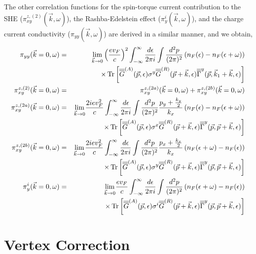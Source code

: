 \documentclass[letter,12pt,preprint,aps]{revtex4-1}
\newcommand{\ba}{\begin{eqnarray}}
\newcommand{\ea}{\end{eqnarray}}
\newcommand{\bl}{\left (}
\newcommand{\br}{\right )}
\newcommand{\Gbar}{\overline{\overline{G}}}
\newcommand{\Gammabar}{\overline{\overline{\Gamma}}}
\begin{document}
The other correlation functions for the spin-torque current contribution to the SHE ($\pi^{z, (2)}_{xy}(\vec{k}, \omega)$), the Rashba-Edelstein effect ($\pi^{i}_{y}(\vec{k}, \omega)$), and the charge current conductivity ($\pi_{yy}(\vec{k}, \omega)$) are derived in a similar manner, and we obtain,
%
\ba
\label{eqn: pizxy corr function}
\pi_{yy}(\vec{k} = 0, \omega) & = & \underset{\vec{k} \to 0}{\lim} \bl \frac{e v_F}{c} \br^2 \int_{-\infty}^{\infty} \frac{d \epsilon}{2 \pi i} \int \frac{d^2 p}{(2 \pi)^2} \bl n_F(\epsilon) - n_F(\epsilon + \omega) \br   \cr
 & & \times \Tr \left[ \Gbar^{(A)}(\vec{p}, \epsilon) \sigma^y \Gbar^{(R)}(\vec{p} + \vec{k}, \epsilon) \Gammabar^{y}(\vec{p}, \vec{k}_1 + \vec{k}, \epsilon) \right] \\
\pi^{z, (2)}_{xy}(\vec{k} = 0, \omega) & = & \pi^{z, (2a)}_{xy}(\vec{k} = 0, \omega) + \pi^{z, (2b)}_{xy}(\vec{k} = 0, \omega) \\
\pi^{z, (2a)}_{xy}(\vec{k} = 0, \omega) & = & \underset{\vec{k} \to 0}{\lim} \frac{2 i e v_F^2}{c} \int_{-\infty}^{\infty} \frac{d \epsilon}{2 \pi i} \int \frac{d^2 p}{(2 \pi)^2} \frac{p_{y} + \frac{k_y}{2}}{k_x} \bl n_F(\epsilon) - n_F(\epsilon + \omega) \br \cr
& & \times \Tr \left[ \Gbar^{(A)}(\vec{p}, \epsilon) \sigma^x \Gbar^{(R)}(\vec{p} + \vec{k}, \epsilon) \Gammabar^{y}(\vec{p}, \vec{p} + \vec{k}, \epsilon) \right] \cr
\pi^{z, (2b)}_{xy}(\vec{k} = 0, \omega) & = & \underset{\vec{k} \to 0}{\lim} \frac{2 i e v_F^2}{c} \int_{-\infty}^{\infty} \frac{d \epsilon}{2 \pi i} \int \frac{d^2 p}{(2 \pi)^2} \frac{p_x + \frac{k_x}{2}}{k_x} \bl n_F(\epsilon + \omega) - n_F(\epsilon) \br \cr
& & \times \Tr \left[ \Gbar^{(A)}(\vec{p}, \epsilon) \sigma^y \Gbar^{(R)}(\vec{p} + \vec{k}, \epsilon) \Gammabar^{y}(\vec{p}, \vec{p} + \vec{k}, \epsilon) \right] \cr
\pi^{i}_{y}(\vec{k} = 0, \omega) & = & \underset{\vec{k} \to 0}{\lim} \frac{e v_F}{c} \int_{-\infty}^{\infty} \frac{d \epsilon}{2 \pi i} \int \frac{d^2 p}{(2 \pi)^2} \bl n_F(\epsilon + \omega) - n_F(\epsilon) \br \cr
& & \times \Tr \left[ \Gbar^{(A)}(\vec{p}, \epsilon) \sigma^i \Gbar^{(R)}(\vec{p} + \vec{k}, \epsilon) \Gammabar^{y}(\vec{p}, \vec{p} + \vec{k}, \epsilon) \right] 
\ea

\section{Vertex Correction}
\end{document}
